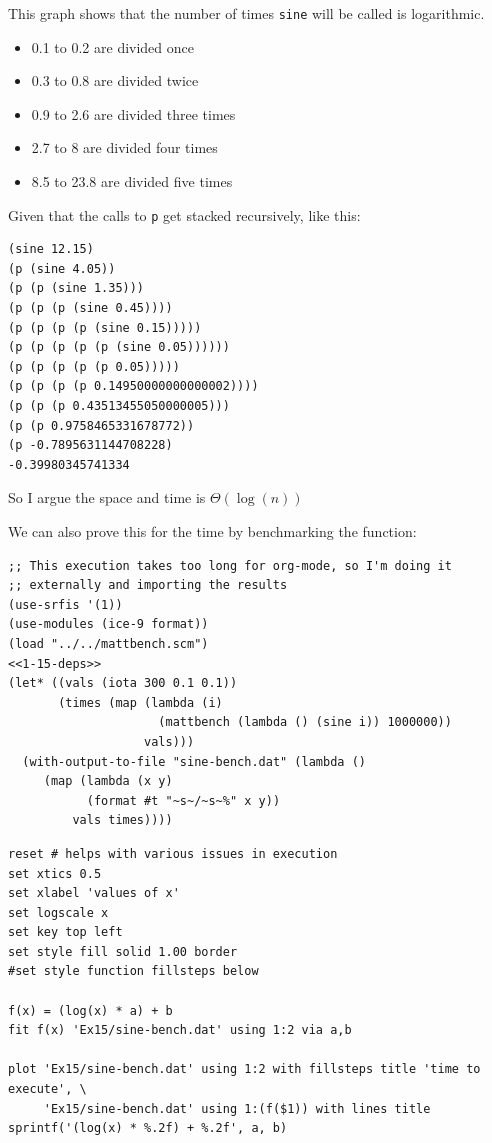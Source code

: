 \documentclass[final,fleqn,titlepage,twoside]{article}
\begin{document}
This graph shows that the number of times \texttt{sine} will be called is
logarithmic.
\begin{itemize}
\item 0.1 to 0.2 are divided once
\item 0.3 to 0.8 are divided twice
\item 0.9 to 2.6 are divided three times
\item 2.7 to 8 are divided four times
\item 8.5 to 23.8 are divided five times
\end{itemize}

Given that the calls to \texttt{p} get stacked recursively, like this:
\begin{verbatim}
(sine 12.15)
(p (sine 4.05))
(p (p (sine 1.35)))
(p (p (p (sine 0.45))))
(p (p (p (p (sine 0.15)))))
(p (p (p (p (p (sine 0.05))))))
(p (p (p (p (p 0.05)))))
(p (p (p (p 0.14950000000000002))))
(p (p (p 0.43513455050000005)))
(p (p 0.9758465331678772))
(p -0.7895631144708228)
-0.39980345741334
\end{verbatim}

So I argue the space and time is \(\Theta(\log(n))\)


We can also prove this for the time by benchmarking the function:

\begin{verbatim}
;; This execution takes too long for org-mode, so I'm doing it
;; externally and importing the results
(use-srfis '(1))
(use-modules (ice-9 format))
(load "../../mattbench.scm")
<<1-15-deps>>
(let* ((vals (iota 300 0.1 0.1))
       (times (map (lambda (i)
                     (mattbench (lambda () (sine i)) 1000000))
                   vals)))
  (with-output-to-file "sine-bench.dat" (lambda ()
     (map (lambda (x y)
           (format #t "~s~/~s~%" x y))
         vals times))))
\end{verbatim}

\begin{verbatim}
reset # helps with various issues in execution
set xtics 0.5
set xlabel 'values of x'
set logscale x
set key top left
set style fill solid 1.00 border
#set style function fillsteps below

f(x) = (log(x) * a) + b
fit f(x) 'Ex15/sine-bench.dat' using 1:2 via a,b

plot 'Ex15/sine-bench.dat' using 1:2 with fillsteps title 'time to execute', \
     'Ex15/sine-bench.dat' using 1:(f($1)) with lines title sprintf('(log(x) * %.2f) + %.2f', a, b)
\end{verbatim}
\end{document}
